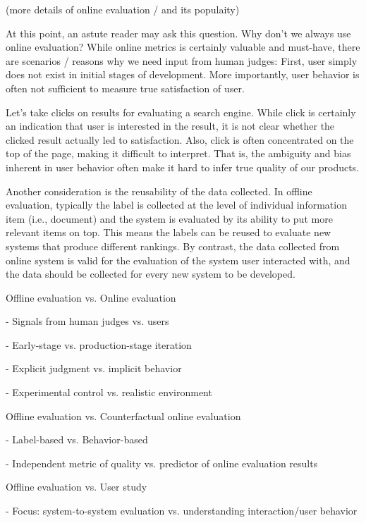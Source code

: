 \documentclass[openany]{now} %
\newcommand{\newpar}{\bigskip\noindent}
\begin{document}
(more details of online evaluation / and its populaity)

At this point, an astute reader may ask this question. Why don’t we always use online evaluation? While online metrics is certainly valuable and must-have, there are scenarios / reasons why we need input from human judges: First, user simply does not exist in initial stages of development. More importantly, user behavior is often not sufficient to measure true satisfaction of user. 

Let's take clicks on results for evaluating a search engine. While click is certainly an indication that user is interested in the result, it is not clear whether the clicked result actually led to satisfaction. Also, click is often concentrated on the top of the page, making it difficult to interpret. That is, the ambiguity and bias inherent in user behavior often make it hard to infer true quality of our products.

Another consideration is the reusability of the data collected. In offline evaluation, typically the label is collected at the level of individual information item (i.e., document) and the system is evaluated by its ability to put more relevant items on top. This means the labels can be reused to evaluate new systems that produce different rankings. By contrast, the data collected from online system is valid for the evaluation of the system user interacted with, and the data should be collected for every new system to be developed.



\newpar
Offline evaluation \cite{INR-009} vs. Online evaluation \cite{INR-XYZ}

- Signals from human judges vs. users

- Early-stage vs. production-stage iteration

- Explicit judgment vs. implicit behavior

- Experimental control vs. realistic environment

\newpar
Offline evaluation vs. Counterfactual online evaluation \cite{chuklin2015click} \cite{Li:2015, li2010contextual}

- Label-based vs. Behavior-based

- Independent metric of quality vs. predictor of online evaluation results

\newpar
Offline evaluation vs. User study \cite{kelly2009methods}

- Focus: system-to-system evaluation vs. understanding interaction/user behavior
\end{document}
